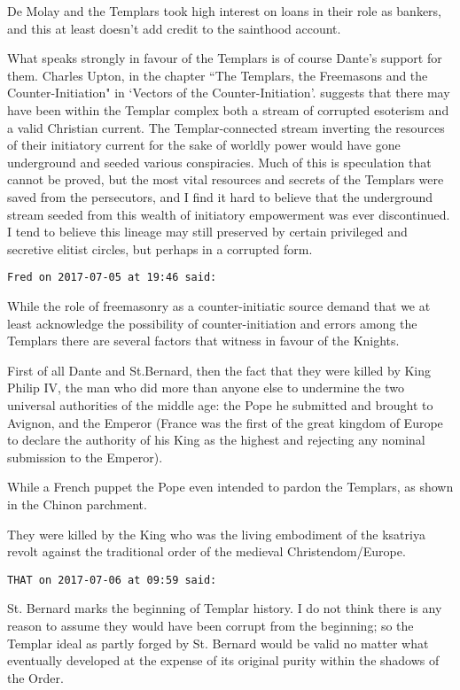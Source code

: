 \begin{footnotesize}
\begin{sffamily}
De Molay and the Templars took high interest on loans in their role as bankers, and this at least doesn't add credit to the sainthood account. 

What speaks strongly in favour of the Templars is of course Dante's support for them. Charles Upton, in the chapter ``The Templars, the Freemasons and the Counter-Initiation" in `Vectors of the Counter-Initiation'. suggests that there may have been within the Templar complex both a stream of corrupted esoterism and a valid Christian current. The Templar-connected stream inverting the resources of their initiatory current for the sake of worldly power would have gone underground and seeded various conspiracies. Much of this is speculation that cannot be proved, but the most vital resources and secrets of the Templars were saved from the persecutors, and I find it hard to believe that the underground stream seeded from this wealth of initiatory empowerment was ever discontinued. I tend to believe this lineage may still preserved by certain privileged and secretive elitist circles, but perhaps in a corrupted form.


\hfill

\texttt{Fred on 2017-07-05 at 19:46 said: }

While the role of freemasonry as a counter-initiatic source demand that we at least acknowledge the possibility of counter-initiation and errors among the Templars there are several factors that witness in favour of the Knights.

First of all Dante and St.Bernard, then the fact that they were killed by King Philip IV, the man who did more than anyone else to undermine the two universal authorities of the middle age: the Pope he submitted and brought to Avignon, and the Emperor (France was the first of the great kingdom of Europe to declare the authority of his King as the highest and rejecting any nominal submission to the Emperor).

While a French puppet the Pope even intended to pardon the Templars, as shown in the Chinon parchment.

They were killed by the King who was the living embodiment of the ksatriya revolt against the traditional order of the medieval Christendom/Europe.


\hfill

\texttt{THAT on 2017-07-06 at 09:59 said: }

St. Bernard marks the beginning of Templar history. I do not think there is any reason to assume they would have been corrupt from the beginning; so the Templar ideal as partly forged by St. Bernard would be valid no matter what eventually developed at the expense of its original purity within the shadows of the Order. 


\end{sffamily}
\end{footnotesize}
